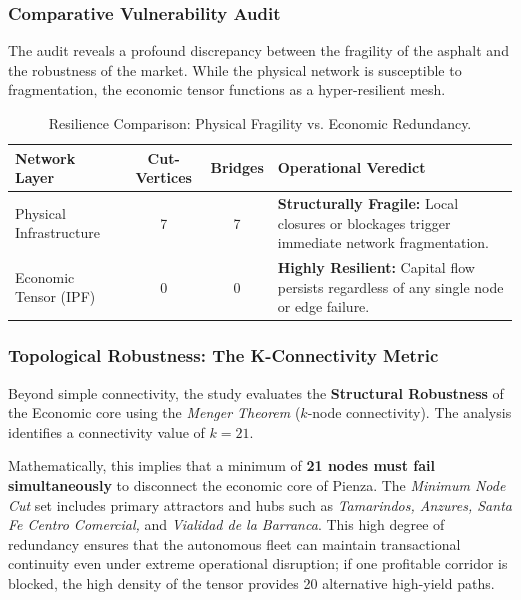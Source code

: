 \subsubsection{Comparative Vulnerability Audit}

The audit reveals a profound discrepancy between the fragility of the asphalt and the robustness of the market. While the physical network is susceptible to fragmentation, the economic tensor functions as a hyper-resilient mesh.

\begin{table}[H]
    \centering
    \small
    \begin{tabularx}{\textwidth}{l c c X}
        \toprule
        \textbf{Network Layer} & \textbf{Cut-Vertices} & \textbf{Bridges} & \textbf{Operational Veredict} \\
        \midrule
        Physical Infrastructure & 7 & 7 & \textbf{Structurally Fragile:} Local closures or blockages trigger immediate network fragmentation. \\
        \addlinespace
        Economic Tensor (IPF) & 0 & 0 & \textbf{Highly Resilient:} Capital flow persists regardless of any single node or edge failure. \\
        \bottomrule
    \end{tabularx}
    \caption{Resilience Comparison: Physical Fragility vs. Economic Redundancy.}
    \label{tab:resilience_audit}
\end{table}

\subsubsection{Topological Robustness: The K-Connectivity Metric}

Beyond simple connectivity, the study evaluates the \textbf{Structural Robustness} of the Economic core using the \textit{Menger Theorem} ($k$-node connectivity). The analysis identifies a connectivity value of \textbf{$k=21$}.

Mathematically, this implies that a minimum of \textbf{21 nodes must fail simultaneously} to disconnect the economic core of Pienza. The \textit{Minimum Node Cut} set includes primary attractors and hubs such as \textit{Tamarindos, Anzures, Santa Fe Centro Comercial,} and \textit{Vialidad de la Barranca}. This high degree of redundancy ensures that the autonomous fleet can maintain transactional continuity even under extreme operational disruption; if one profitable corridor is blocked, the high density of the tensor provides 20 alternative high-yield paths.

